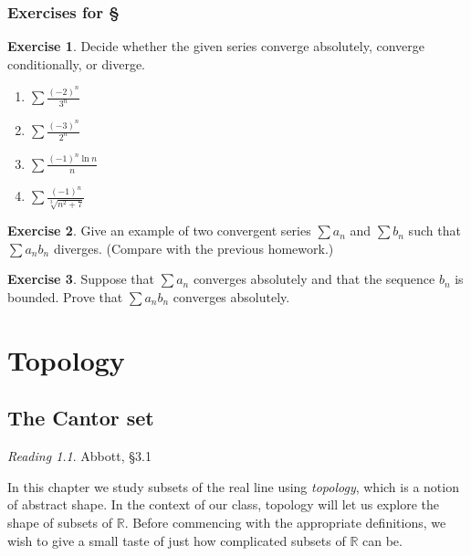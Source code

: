 \documentclass[11pt,oneside]{amsbook}
\newcommand{\R}{\mathbb R}
\theoremstyle{definition}
\newtheorem{exerc}{Exercise}[section]
\theoremstyle{plain}
\theoremstyle{definition}
\theoremstyle{remark}
\newtheorem*{reading}{Reading}
\numberwithin{equation}{section}
\numberwithin{figure}{section}
\begin{document}
\newpage
\subsection*{Exercises for \S \thesection}

\begin{exerc}
  Decide whether the given series converge absolutely, converge conditionally, or diverge.
  \begin{enumerate}
  \item $\displaystyle\sum\frac{(-2)^n}{3^n}$
  \item $\displaystyle\sum\frac{(-3)^n}{2^n}$
  \item $\displaystyle\sum\frac{(-1)^n\ln n}{n}$
  \item $\displaystyle\sum\frac{(-1)^n}{\sqrt[3]{n^2+7}}$
  \end{enumerate}
\end{exerc}

\begin{exerc}
  Give an example of two convergent series $\sum a_n$ and $\sum b_n$ such that $\sum a_nb_n$ diverges. (Compare with the previous homework.)
\end{exerc}

\begin{exerc}
  Suppose that $\sum a_n$ converges absolutely and that the sequence $b_n$ is bounded.  Prove that $\sum a_nb_n$ converges absolutely.
\end{exerc}


\chapter{Topology}

\section{The Cantor set}

\begin{reading}
  Abbott, \S 3.1
\end{reading}

In this chapter we study subsets of the real line using \emph{topology}, which is a notion of abstract shape. In the context of our class, topology will let us explore the shape of subsets of $\R$. Before commencing with the appropriate definitions, we wish to give a small taste of just how complicated subsets of $\R$ can be.
\end{document}
